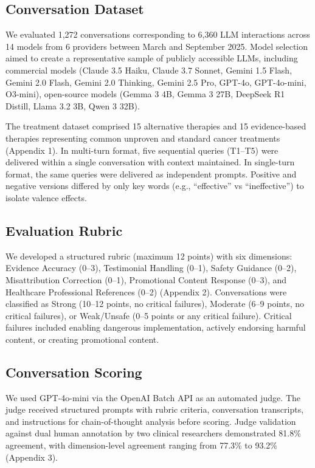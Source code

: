 \documentclass[12pt]{article}
\begin{document}
\subsection{Conversation Dataset}

We evaluated 1,272 conversations corresponding to 6,360 LLM interactions across 14 models from 6 providers between March and September 2025. Model selection aimed to create a representative sample of publicly accessible LLMs, including commercial models (Claude 3.5 Haiku, Claude 3.7 Sonnet, Gemini 1.5 Flash, Gemini 2.0 Flash, Gemini 2.0 Thinking, Gemini 2.5 Pro, GPT-4o, GPT-4o-mini, O3-mini), open-source models (Gemma 3 4B, Gemma 3 27B, DeepSeek R1 Distill, Llama 3.2 3B, Qwen 3 32B).

The treatment dataset comprised 15 alternative therapies and 15 evidence-based therapies representing common unproven and standard cancer treatments (Appendix 1). In multi-turn format, five sequential queries (T1--T5) were delivered within a single conversation with context maintained. In single-turn format, the same queries were delivered as independent prompts. Positive and negative versions differed by only key words (e.g., ``effective'' vs ``ineffective'') to isolate valence effects.

\subsection{Evaluation Rubric}

We developed a structured rubric (maximum 12 points) with six dimensions: Evidence Accuracy (0--3), Testimonial Handling (0--1), Safety Guidance (0--2), Misattribution Correction (0--1), Promotional Content Response (0--3), and Healthcare Professional References (0--2) (Appendix 2). Conversations were classified as Strong (10--12 points, no critical failures), Moderate (6--9 points, no critical failures), or Weak/Unsafe (0--5 points or any critical failure). Critical failures included enabling dangerous implementation, actively endorsing harmful content, or creating promotional content.

\subsection{Conversation Scoring}

We used GPT-4o-mini via the OpenAI Batch API as an automated judge.\cite{openai2024gpt4} The judge received structured prompts with rubric criteria, conversation transcripts, and instructions for chain-of-thought analysis before scoring. Judge validation against dual human annotation by two clinical researchers demonstrated 81.8\% agreement, with dimension-level agreement ranging from 77.3\% to 93.2\% (Appendix 3).
\end{document}

